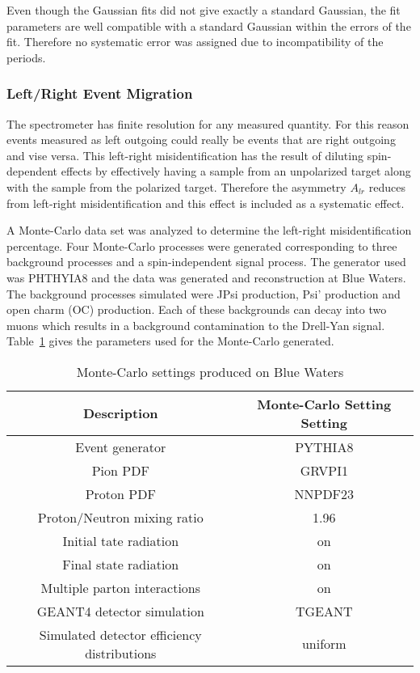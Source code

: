 Even though the Gaussian fits did not give exactly a standard Gaussian, the fit
parameters are well compatible with a standard Gaussian within the errors of the
fit.  Therefore no systematic error was assigned due to incompatibility of the
periods.

\subsubsection{Left/Right Event Migration}
The spectrometer has finite resolution for any measured quantity.  For this
reason events measured as left outgoing could really be events that are right
outgoing and vise versa.  This left-right misidentification has the result of
diluting spin-dependent effects by effectively having a sample from an
unpolarized target along with the sample from the polarized target.  Therefore
the asymmetry $A_{lr}$ reduces from left-right misidentification and this
effect is included as a systematic effect. 

A Monte-Carlo data set was analyzed to determine the left-right
misidentification percentage.  Four Monte-Carlo processes were generated
corresponding to three background processes and a spin-independent signal
process.  The generator used was PHTHYIA8 and the data was generated and
reconstruction at Blue Waters.  The background processes simulated were JPsi
production, Psi' production and open charm (OC) production.  Each of these
backgrounds can decay into two muons which results in a background contamination
to the Drell-Yan signal.  Table~\ref{tab::MCproduction} gives the parameters
used for the Monte-Carlo generated.

\begin{table}[h!t]
  \centering
  \caption{Monte-Carlo settings produced on Blue Waters}
  \label{tab::MCproduction}
  \begin{tabular}{ |c|c| }
    \hline
    \textbf{Description}& \textbf{Monte-Carlo Setting Setting} \\ \hline
    \hline
    Event generator& PYTHIA8\\
    \hline

    Pion PDF& GRVPI1\\
    \hline

    Proton PDF& NNPDF23\\
    \hline
    
    Proton/Neutron mixing ratio& 1.96\\
    \hline

    Initial tate radiation& on\\
    \hline
    
    Final state radiation& on\\
    \hline
    
    Multiple parton interactions& on\\
    \hline

    GEANT4 detector simulation& TGEANT \\
    \hline

    Simulated detector efficiency distributions& uniform\\
    \hline
    
  \end{tabular}
\end{table}

